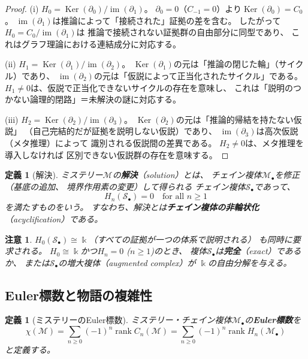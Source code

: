\documentclass[12pt,twocolumn]{ltjsarticle}
\newtheorem{definition}[theorem]{定義}
\newtheorem{remark}[theorem]{注意}
\newcommand{\im}{\operatorname{im}}
\newcommand{\Ker}{\operatorname{Ker}}
\renewcommand{\rank}{\operatorname{rank}}
\newcommand{\Mys}{\mathcal{M}}
\newcommand{\Sol}{\mathcal{S}}
\newcommand{\kk}{\Bbbk}
\begin{document}
\begin{proof}
(i) $H_0 = \Ker(\partial_0) / \im(\partial_1)$。
$\partial_0 = 0$（$C_{-1} = 0$）より$\Ker(\partial_0) = C_0$。
$\im(\partial_1)$は推論によって「接続された」証拠の差を含む。
したがって$H_0 = C_0 / \im(\partial_1)$は
推論で接続されない証拠群の自由部分に同型であり、
これはグラフ理論における連結成分に対応する。

(ii) $H_1 = \Ker(\partial_1) / \im(\partial_2)$。
$\Ker(\partial_1)$の元は「推論の閉じた輪」（サイクル）であり、
$\im(\partial_2)$の元は「仮説によって正当化されたサイクル」である。
$H_1 \neq 0$は、仮説で正当化できないサイクルの存在を意味し、
これは「説明のつかない論理的閉路」＝未解決の謎に対応する。

(iii) $H_2 = \Ker(\partial_2) / \im(\partial_3)$。
$\Ker(\partial_2)$の元は「推論的帰結を持たない仮説」
（自己完結的だが証拠を説明しない仮説）であり、
$\im(\partial_3)$は高次仮説（メタ推理）によって
識別される仮説間の差異である。
$H_2 \neq 0$は、メタ推理を導入しなければ
区別できない仮説群の存在を意味する。
\end{proof}

\begin{definition}[解決]
\label{def:solution}
ミステリー$\Mys$の\textbf{解決}（solution）とは、
チェイン複体$\Mys_\bullet$を修正（基底の追加、
境界作用素の変更）して得られる
チェイン複体$\Sol_\bullet$であって、
\begin{equation}
H_n(\Sol_\bullet) = 0 \quad \text{for all } n \geq 1
\label{eq:solution}
\end{equation}
を満たすものをいう。
すなわち、解決とは\textbf{チェイン複体の非輪状化}
（acyclification）である。
\end{definition}

\begin{remark}
$H_0(\Sol_\bullet) \cong \kk$（すべての証拠が一つの体系で説明される）
も同時に要求される。
$H_0 \cong \kk$かつ$H_n = 0$ ($n \geq 1$)のとき、
複体$\Sol_\bullet$は\textbf{完全}（exact）であるか、
または$\Sol_\bullet$の増大複体（augmented complex）が
$\kk$の自由分解を与える。
\end{remark}


\subsection{Euler標数と物語の複雑性}

\begin{definition}[ミステリーのEuler標数]
ミステリー・チェイン複体$\Mys_\bullet$の\textbf{Euler標数}を
\begin{equation}
\chi(\Mys) = \sum_{n \geq 0} (-1)^n \rank C_n(\Mys)
= \sum_{n \geq 0} (-1)^n \rank H_n(\Mys_\bullet)
\end{equation}
と定義する。
\end{definition}
\end{document}

